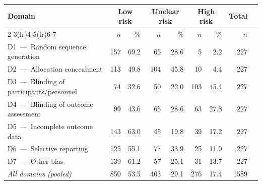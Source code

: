\begin{tabular}{lrrrrrrrr}
\toprule
Domain & \multicolumn{2}{c}{Low risk} & \multicolumn{2}{c}{Unclear risk} & \multicolumn{2}{c}{High risk} & \multicolumn{1}{c}{Total} \\
\cmidrule(lr){2-3}\cmidrule(lr){4-5}\cmidrule(lr){6-7}
 & $n$ & \% & $n$ & \% & $n$ & \% & $n$ \\
\midrule
D1 \,---\, Random sequence generation & 157 & 69.2 & 65 & 28.6 & 5 & 2.2 & 227 \\
D2 \,---\, Allocation concealment & 113 & 49.8 & 104 & 45.8 & 10 & 4.4 & 227 \\
D3 \,---\, Blinding of participants/personnel & 74 & 32.6 & 50 & 22.0 & 103 & 45.4 & 227 \\
D4 \,---\, Blinding of outcome assessment & 99 & 43.6 & 65 & 28.6 & 63 & 27.8 & 227 \\
D5 \,---\, Incomplete outcome data & 143 & 63.0 & 45 & 19.8 & 39 & 17.2 & 227 \\
D6 \,---\, Selective reporting & 125 & 55.1 & 77 & 33.9 & 25 & 11.0 & 227 \\
D7 \,---\, Other bias & 139 & 61.2 & 57 & 25.1 & 31 & 13.7 & 227 \\
\midrule
\textit{All domains (pooled)} & 850 & 53.5 & 463 & 29.1 & 276 & 17.4 & 1589 \\
\bottomrule
\end{tabular}